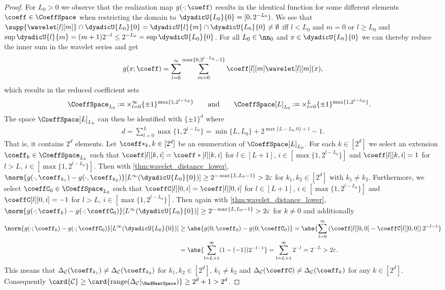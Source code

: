\documentclass[twoside,11pt]{article}
\newcommand{\defeq}{\mathbin{:=}}
\newcommand{\set}[1]{\ensuremath{\mathcal{#1}}}
\begin{document}
\begin{proof}
    For $L_0>0$ we observe that the realization map $g(\cdot;\coeff)$ results in the identical function for some different elements $\coeff\in\CoeffSpace$ when restricting the domain to $\dyadicU{L_0}{0}=[0,2^{-L_0})$.
    We see that $\supp{\wavelet[l][m]}\cap \dyadicU{L_0}{0}=\dyadicU{l}{m}\cap \dyadicU{L_0}{0}\neq \emptyset$ iff $l<L_0$ and $m=0$ or $l\geq L_0$ and $\sup \dyadicU{l}{m}=(m+1)2^{-l}\leq 2^{-L_0}=\sup \dyadicU{L_0}{0}$.
    For all $L_0\in\nn_0$ and $x\in \dyadicU{L_0}{0}$ we can thereby reduce the inner sum in the wavelet series and get
    \begin{align}
        g(x;\coeff)=\sum_{l=0}^\infty\sum_{m=0}^{\max\{0,2^{l-L_0}-1\}}\coeff[l][m]\wavelet[l][m](x),
    \end{align}
    which results in the reduced coefficient sets
    \begin{align}
        \CoeffSpace_{L_0}&\defeq \times_{l=0}^\infty\{\pm 1\}^{\max\{1,2^{l-L_0}\}}
        \qquad\text{and}\qquad
        \CoeffSpace[L]_{L_0}\defeq \times_{l=0}^L\{\pm 1\}^{\max\{1,2^{l-L_0}\}}.
    \end{align}
    The space $\CoeffSpace[L]_{L_0}$ can then be identified with $\{\pm 1\}^d$ where 
    \begin{align}
        d=\sum_{l=0}^L\max\{1,2^{l-L_0}\}=\min\{L,L_0\}+2^{\max\{L-L_0,0\}+1}-1.
    \end{align}
    That is, it contains $2^d$ elements.
    Let $\coeff*_k, k\in[2^d]$ be an enumeration of $\CoeffSpace[L]_{L_0}$.
    For each $k\in[2^d]$ we select an extension $\coeff_k\in\CoeffSpace_{L_0}$ such that $\coeff[l][k,i]=\coeff*[l][k,i]$ for $l\in[L+1],\,i\in[\max\{1,2^{l-L_0}\}]$ and $\coeff[l][k,i]=1$ for $l>L,\,i\in[\max\{1,2^{l-L_0}\}]$.
    Then with \cref{thm:wavelet_distance_lower}, $\norm{g(\cdot,\coeff_{k_1})-g(\cdot,\coeff_{k_2})}[{L^\infty(\dyadicU{L_0}{0})}]\geq 2^{-\max\{L,L_0-1\}}>2\varepsilon$ for $k_1,k_2\in[2^d]$ with $k_1\neq k_2$.
    Furthermore, we select $\coeffC_0\in\CoeffSpace_{L_0}$ such that $\coeffC[l][0,i]=\coeff[l][0,i]$ for $l\in[L+1],\,i\in[\max\{1,2^{l-L_0}\}]$ and $\coeffC[l][0,i]=-1$ for $l>L,\,i\in[\max\{1,2^{l-L_0}\}]$.
    Then again with \cref{thm:wavelet_distance_lower}, $\norm{g(\cdot;\coeff_k)-g(\cdot;\coeffC_0)}[{L^\infty(\dyadicU{L_0}{0})}]\geq 2^{-\max\{L,L_0-1\}}>2\varepsilon$ for $k\neq 0$ and additionally
    \begin{align}
        \norm{g(\cdot;\coeff_0)-g(\cdot;\coeffC_0)}[{L^\infty(\dyadicU{L_0}{0})}]
        &\geq
        \abs{g(0;\coeff_0)-g(0;\coeffC_0)}
        =
        \abs{\sum_{l=0}^\infty \left(\coeff[l][0,0]-\coeffC[l][0,0]\right)2^{-l-1}}
        \\&
        =
        \abs{\sum_{l=L+1}^\infty (1-(-1))2^{-l-1}}
        =
        \sum_{l=L+1}^\infty 2^{-l}
        =2^{-L}>2\varepsilon.
    \end{align}
    This means that $\Delta_{\set{C}}(\coeff_{k_1})\neq \Delta_{\set{C}}(\coeff_{k_2})$ for $k_1,k_2\in[2^d],\,k_1\neq k_2$ and $\Delta_{\set{C}}(\coeffC)\neq\Delta_{\set{C}}(\coeff_{k})$ for any $k\in[2^d]$.
    Consequently 
    $
    \card{\mathcal{C}}
    \geq
    \card{\operatorname{range}(\Delta_\set{C}|_{\RadHaarSpace})}
    \geq 2^d+1>2^d$.
\end{proof}
\end{document}
